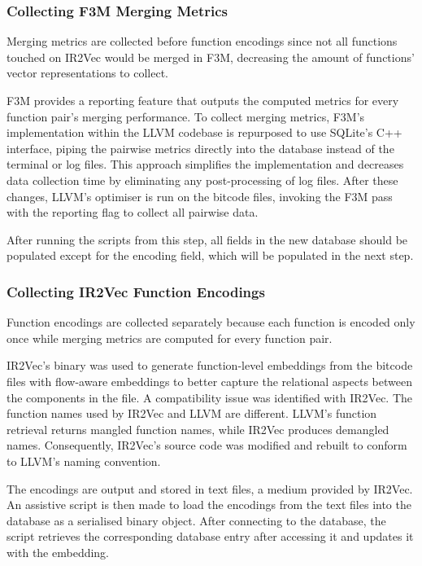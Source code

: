 \subsubsection{Collecting F3M Merging Metrics}
Merging metrics are collected before function encodings since not all functions touched on IR2Vec would be merged in F3M, decreasing the amount of functions' vector representations to collect.

F3M provides a reporting feature that outputs the computed metrics for every function pair's merging performance. To collect merging metrics, F3M's implementation within the LLVM codebase is repurposed to use SQLite's C++ interface, piping the pairwise metrics directly into the database instead of the terminal or log files. This approach simplifies the implementation and decreases data collection time by eliminating any post-processing of log files. After these changes, LLVM's optimiser is run on the bitcode files, invoking the F3M pass with the reporting flag to collect all pairwise data.

After running the scripts from this step, all fields in the new database should be populated except for the encoding field, which will be populated in the next step.

\subsubsection{Collecting IR2Vec Function Encodings}
Function encodings are collected separately because each function is encoded only once while merging metrics are computed for every function pair.

IR2Vec's binary was used to generate function-level embeddings from the bitcode files with flow-aware embeddings to better capture the relational aspects between the components in the file. A compatibility issue was identified with IR2Vec. The function names used by IR2Vec and LLVM are different. LLVM's function retrieval returns mangled function names, while IR2Vec produces demangled names. Consequently, IR2Vec's source code was modified and rebuilt to conform to LLVM's naming convention. 

The encodings are output and stored in text files, a medium provided by IR2Vec. An assistive script is then made to load the encodings from the text files into the database as a serialised binary object. After connecting to the database, the script retrieves the corresponding database entry after accessing it and updates it with the embedding. 

